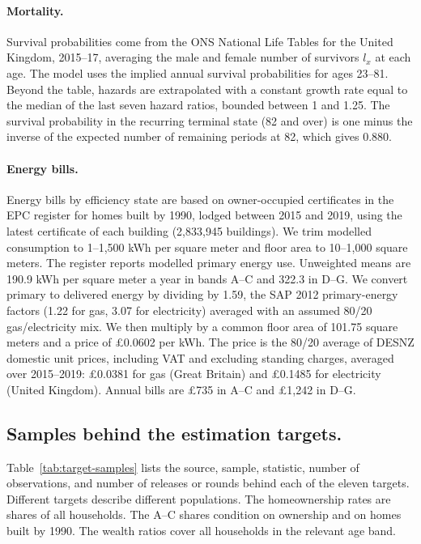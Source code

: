 \paragraph{Mortality.} Survival probabilities come from the ONS National Life
Tables for the United Kingdom, 2015--17, averaging the male and female
number of survivors $l_x$ at each age. The model uses the implied annual
survival probabilities for ages 23--81. Beyond the table, hazards are
extrapolated with a constant growth rate equal to the median of the last
seven hazard ratios, bounded between 1 and 1.25. The survival probability
in the recurring terminal state (82 and over) is one minus the inverse of
the expected number of remaining periods at 82, which gives 0.880.

\paragraph{Energy bills.} Energy bills by efficiency state are based on
owner-occupied certificates in the EPC register for homes built by 1990,
lodged between 2015 and 2019, using the latest certificate of each building
(2,833,945 buildings). We trim modelled consumption to 1--1,500 kWh per
square meter and floor area to 10--1,000 square meters. The register
reports modelled primary energy use. Unweighted means are 190.9 kWh per
square meter a year in bands A--C and 322.3 in D--G. We convert primary
to delivered energy by dividing by 1.59, the SAP 2012 primary-energy factors
(1.22 for gas, 3.07 for electricity) averaged with an assumed 80/20
gas/electricity mix. We then multiply by a common floor area of 101.75
square meters and a price of £0.0602 per kWh. The price is the 80/20 average
of DESNZ domestic unit prices, including VAT and excluding standing charges,
averaged over 2015--2019: £0.0381 for gas (Great Britain) and £0.1485 for
electricity (United Kingdom). Annual bills are £735 in A--C and £1,242 in
D--G.

\subsection{Samples behind the estimation targets.}\label{app:data-targets}

Table~\ref{tab:target-samples} lists the source, sample, statistic, number
of observations, and number of releases or rounds behind each of the eleven
targets. Different targets describe different populations. The
homeownership rates are shares of all households. The A--C shares condition
on ownership and on homes built by 1990. The wealth ratios cover all
households in the relevant age band.

